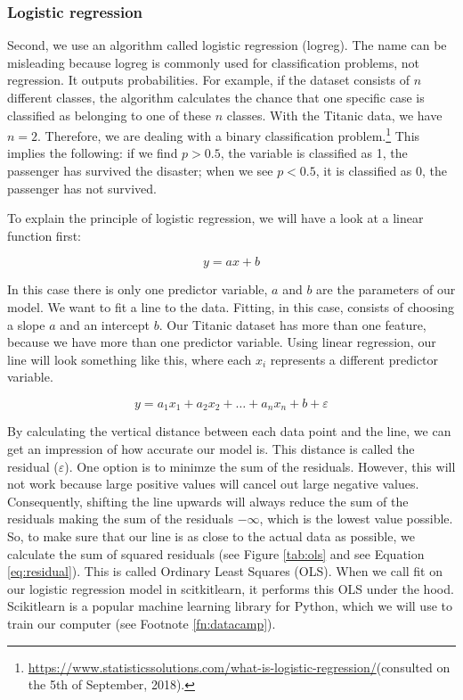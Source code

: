 \documentclass[11pt]{article}
\begin{document}
\subsubsection{Logistic regression}
\label{sec:org63fc4cc}
Second, we use an algorithm called logistic regression (logreg). The name can be misleading because logreg is commonly used for classification problems, not regression. It outputs probabilities. For example, if the dataset consists of \(n\) different classes, the algorithm calculates the chance that one specific case is classified as belonging to one of these \(n\) classes. With the Titanic data, we have \(n=2\). Therefore, we are dealing with a binary classification problem.\footnote{\url{https://www.statisticssolutions.com/what-is-logistic-regression/}(consulted on the 5th of September, 2018).} This implies the following: if we find \(p>0.5\), the variable is classified as 1, the passenger has survived the disaster; when we see \(p<0.5\), it is classified as 0, the passenger has not survived. 

To explain the principle of logistic regression, we will have a look at a linear function first:

\begin{equation}
y=ax+b
\end{equation} 

In this case there is only one predictor variable, \(a\) and \(b\) are the parameters of our model. We want to fit a line to the data. Fitting, in this case, consists of choosing a slope \(a\) and an intercept \(b\). Our Titanic dataset has more than one feature, because we have more than one predictor variable. Using linear regression, our line will look something like this, where each \(x_i\) represents a different predictor variable. 

\begin{equation}
y=a_1x_1+a_2x_2+ \dots + a_nx_n+b+\varepsilon  
\end{equation}

By calculating the vertical distance between each data point and the line, we can get an impression of how accurate our model is. This distance is called the residual (\(\varepsilon\)). One option is to minimze the sum of the residuals. However, this will not work because large positive values will cancel out large negative values. Consequently, shifting the line upwards will always reduce the sum of the residuals making the sum of the residuals \(-\infty\), which is the lowest value possible. So, to make sure that our line is as close to the actual data as possible, we calculate the sum of squared residuals (see Figure \ref{tab:ols} and see Equation \ref{eq:residual}). This is called Ordinary Least Squares (OLS). When we call fit on our logistic regression model in scitkitlearn, it performs this OLS under the hood. Scikitlearn is a popular machine learning library for Python, which we will use to train our computer (see Footnote \ref{fn:datacamp}).
\end{document}
